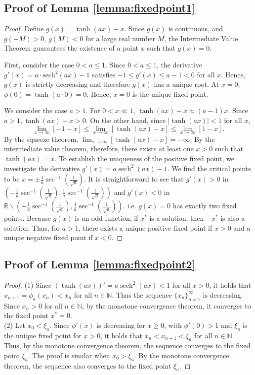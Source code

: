 \documentclass{article} \usepackage{iclr2025_conference,times}
\DeclareMathOperator{\sech}{sech}
\begin{document}
\subsection{Proof of Lemma \ref{lemma:fixedpoint1}}\label{lemma1_proof}
\begin{proof}
Define $g(x) = \tanh(ax) - x$. Since $g(x)$ is continuous, and $g(-M)>0$, $g(M)<0$ for a large real number $M$, the Intermediate Value Theorem guarantees the existence of a point $x$ such that $g(x) = 0$. 

First, consider the case \(0 < a \leq 1\). Since $0 < a \leq 1$, the derivative $g'(x) = a \cdot \text{sech}^2(ax) - 1$ satisfies $-1 \leq g'(x) \leq a - 1 < 0$ for all $x$. Hence, $g(x)$ is strictly decreasing and therefore $g(x)$ has a unique root. At $x=0$, $\phi(0) = \tanh(a\cdot 0) = 0$. Hence, $x=0$ is the unique fixed point.

We consider the case $a>1$. For $0 < x \ll 1$, $\tanh(ax) - x \approx (a-1)x$. Since $a > 1, \tanh(ax)-x>0$. On the other hand, since $|\tanh(ax)|
< 1$ for all $x$, $$\lim_{x \to \infty}[-1-x]\le \lim_{x \to \infty} [\tanh(ax) - x] \le \lim_{x \to \infty} [1 - x].$$ 
By the squeeze theorem, $\lim_{x \to \infty} [\tanh(ax) - x] = -\infty$.
By the intermediate value theorem, therefore, there exists at least one $x>0$ such that $\tanh(ax)=x$. To establish the uniqueness of the positive fixed point, we investigate the derivative $g'(x) = a \sech^2(ax)-1$. We find the critical points to be $x= \pm\frac{1}{a}\sec^{-1}(\frac{1}{\sqrt{a}})$. It is straightforward to see that $g'(x) > 0$ in $\left(-\frac{1}{a}\sec^{-1}(\frac{1}{\sqrt{a}}), \frac{1}{a}\sec^{-1}(\frac{1}{\sqrt{a}})\right)$ and $g'(x) <0$ in $\mathbb{R}\backslash\left(-\frac{1}{a}\sec^{-1}(\frac{1}{\sqrt{a}}), \frac{1}{a}\sec^{-1}(\frac{1}{\sqrt{a}})\right)$. i.e. $g(x)=0$ has exactly two fixed points. Because $g(x)$ is an odd function, if $x^{\ast}$ is a solution, then $-x^{\ast}$ is also a solution. Thus, for $a>1$, 
there exists a unique positive fixed point if $x > 0$ and a unique negative fixed point if $x < 0$.
\end{proof}

\subsection{Proof of Lemma \ref{lemma:fixedpoint2}}\label{lemma2_proof}
\begin{proof}
(1) Since $(\tanh(ax))'=a\sech^2(ax)<1$ for all $x>0$,
it holds that $x_{n+1}=\phi_a(x_n)<x_n$ for all $n\in \mathbb{N}$. Thus the sequence $\{x_n\}_{n=1}^{\infty}$ is decreasing. Since $x_n>0$ for all $n\in \mathbb{N}$, by the monotone convergence theorem, it converges to the fixed point $x^*=0$.\\
(2) Let $x_0<\xi_a$. Since $\phi'(x)$ is decreasing for $x\geq 0$, with $\phi'(0)>1$ and $\xi_a$ is the unique fixed point for $x>0$, it holds that $x_n<x_{n+1} <\xi_a$ for all $n\in\mathbb{N}$. Thus, by the monotone convergence theorem, the sequence converges to the fixed point $\xi_a$. 
The proof is similar when $x_0 >\xi_a$. By the monotone convergence theorem, the sequence also converges to the fixed point $\xi_a$. 
\end{proof}
\end{document}
